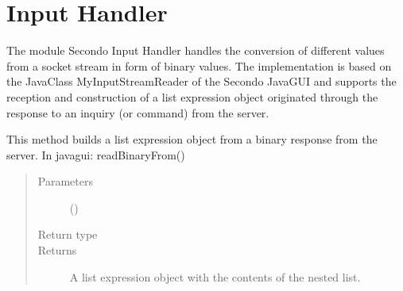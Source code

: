 \documentclass[letterpaper,10pt,english]{sphinxmanual}
\begin{document}
\section{ Input Handler}
\label{\detokenize{index:module-secondodb.api.support.secondoinputhandler}}\label{\detokenize{index:sec-input-handler}}
The module Secondo Input Handler handles the conversion of different values from a socket stream in form of binary
values. The implementation is based on the Java\sphinxhyphen{}Class MyInputStreamReader of the Secondo JavaGUI and supports the
reception and construction of a list expression object originated through the response to an inquiry (or command) from
the  server.

\begin{fulllineitems}
\label{\detokenize{index:secondodb.api.support.secondoinputhandler.build_list_expr_from_binary}}
This method builds a list expression object from a binary response from the  server.
In javagui: readBinaryFrom()
\begin{quote}\begin{description}
\item[{Parameters}] \leavevmode
{} () \textendash{} 

\item[{Return type}] \leavevmode
{}

\item[{Returns}] \leavevmode
A list expression object with the contents of the nested list.

\end{description}\end{quote}

\end{fulllineitems}
\end{document}

